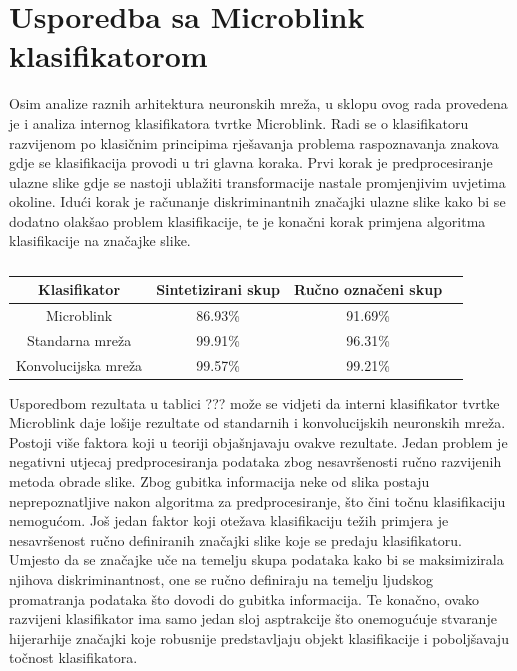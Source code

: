 \documentclass[lmodern, utf8, diplomski, numeric]{fer}
\begin{document}
\section{Usporedba sa Microblink klasifikatorom}

Osim analize raznih arhitektura neuronskih mreža, u sklopu ovog rada provedena je i analiza internog klasifikatora tvrtke Microblink. Radi se o klasifikatoru razvijenom po klasičnim principima rješavanja problema raspoznavanja znakova gdje se klasifikacija provodi u tri glavna koraka. Prvi korak je predprocesiranje ulazne slike gdje se nastoji ublažiti transformacije nastale promjenjivim uvjetima okoline. Idući korak je računanje diskriminantnih značajki ulazne slike kako bi se dodatno olakšao problem klasifikacije, te je konačni korak primjena algoritma klasifikacije na značajke slike.

\begin{table}[ht!]
\begin{center}
\centering
    \begin{tabular}{ | c| c| c|c |}
    \hline    		
    Klasifikator & Sintetizirani skup  & Ručno označeni skup \\ \hline
    Microblink  & 86.93\% & 91.69\%  \\ \hline
    Standarna mreža & 99.91\% & 96.31\%  \\ \hline
    Konvolucijska mreža & 99.57\% &  99.21\% \\
    \hline
    \end{tabular}
\end{center}
\caption{}
\end{table}

Usporedbom rezultata u tablici ??? može se vidjeti da interni klasifikator tvrtke Microblink daje lošije rezultate od standarnih i konvolucijskih neuronskih mreža.
Postoji više faktora koji u teoriji objašnjavaju ovakve rezultate. Jedan problem je negativni utjecaj predprocesiranja podataka zbog nesavršenosti ručno razvijenih metoda obrade slike. Zbog gubitka informacija neke od slika postaju neprepoznatljive nakon algoritma za predprocesiranje, što čini točnu klasifikaciju nemogućom. Još jedan faktor koji otežava klasifikaciju težih primjera je nesavršenost ručno definiranih značajki slike koje se predaju klasifikatoru. Umjesto da se značajke uče na temelju skupa podataka kako bi se maksimizirala njihova diskriminantnost, one se ručno definiraju na temelju ljudskog promatranja podataka što dovodi do gubitka informacija. Te konačno, ovako razvijeni klasifikator ima samo jedan sloj asptrakcije što onemogućuje stvaranje hijerarhije značajki koje robusnije predstavljaju objekt klasifikacije i poboljšavaju točnost klasifikatora.
\end{document}
